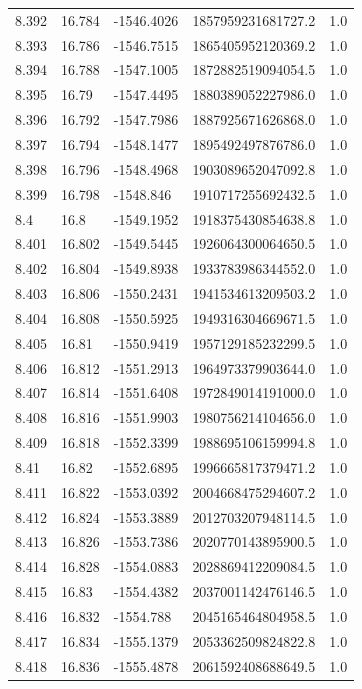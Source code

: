 \begin{tabular}{lllll}
8.392 & 16.784 & -1546.4026 & 1857959231681727.2 & 1.0 \\
8.393 & 16.786 & -1546.7515 & 1865405952120369.2 & 1.0 \\
8.394 & 16.788 & -1547.1005 & 1872882519094054.5 & 1.0 \\
8.395 & 16.79 & -1547.4495 & 1880389052227986.0 & 1.0 \\
8.396 & 16.792 & -1547.7986 & 1887925671626868.0 & 1.0 \\
8.397 & 16.794 & -1548.1477 & 1895492497876786.0 & 1.0 \\
8.398 & 16.796 & -1548.4968 & 1903089652047092.8 & 1.0 \\
8.399 & 16.798 & -1548.846 & 1910717255692432.5 & 1.0 \\
8.4 & 16.8 & -1549.1952 & 1918375430854638.8 & 1.0 \\
8.401 & 16.802 & -1549.5445 & 1926064300064650.5 & 1.0 \\
8.402 & 16.804 & -1549.8938 & 1933783986344552.0 & 1.0 \\
8.403 & 16.806 & -1550.2431 & 1941534613209503.2 & 1.0 \\
8.404 & 16.808 & -1550.5925 & 1949316304669671.5 & 1.0 \\
8.405 & 16.81 & -1550.9419 & 1957129185232299.5 & 1.0 \\
8.406 & 16.812 & -1551.2913 & 1964973379903644.0 & 1.0 \\
8.407 & 16.814 & -1551.6408 & 1972849014191000.0 & 1.0 \\
8.408 & 16.816 & -1551.9903 & 1980756214104656.0 & 1.0 \\
8.409 & 16.818 & -1552.3399 & 1988695106159994.8 & 1.0 \\
8.41 & 16.82 & -1552.6895 & 1996665817379471.2 & 1.0 \\
8.411 & 16.822 & -1553.0392 & 2004668475294607.2 & 1.0 \\
8.412 & 16.824 & -1553.3889 & 2012703207948114.5 & 1.0 \\
8.413 & 16.826 & -1553.7386 & 2020770143895900.5 & 1.0 \\
8.414 & 16.828 & -1554.0883 & 2028869412209084.5 & 1.0 \\
8.415 & 16.83 & -1554.4382 & 2037001142476146.5 & 1.0 \\
8.416 & 16.832 & -1554.788 & 2045165464804958.5 & 1.0 \\
8.417 & 16.834 & -1555.1379 & 2053362509824822.8 & 1.0 \\
8.418 & 16.836 & -1555.4878 & 2061592408688649.5 & 1.0 \\

\end{tabular}
